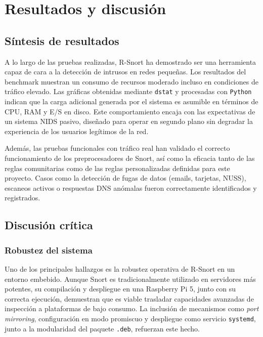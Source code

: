 \documentclass[11pt,a4paper,twoside]{report}
\begin{document}
\chapter*{Resultados y discusión}

\section{Síntesis de resultados}

A lo largo de las pruebas realizadas, R-Snort ha demostrado ser una herramienta capaz de cara a la detección de intrusos en redes pequeñas. Los resultados del benchmark muestran un consumo de recursos moderado incluso en condiciones de tráfico elevado. Las gráficas obtenidas mediante \texttt{dstat} y procesadas con \texttt{Python} indican que la carga adicional generada por el sistema es asumible en términos de CPU, RAM y E/S en disco. Este comportamiento encaja con las expectativas de un sistema NIDS pasivo, diseñado para operar en segundo plano sin degradar la experiencia de los usuarios legítimos de la red.\newline

Además, las pruebas funcionales con tráfico real han validado el correcto funcionamiento de los preprocesadores de Snort, así como la eficacia tanto de las reglas comunitarias como de las reglas personalizadas definidas para este proyecto. Casos como la detección de fugas de datos (emails, tarjetas, NUSS), escaneos activos o respuestas DNS anómalas fueron correctamente identificados y registrados.

\section{Discusión crítica}

\subsection{Robustez del sistema}

Uno de los principales hallazgos es la robustez operativa de R-Snort en un entorno embebido. Aunque Snort es tradicionalmente utilizado en servidores más potentes, su compilación y despliegue en una Raspberry Pi 5, junto con su correcta ejecución, demuestran que es viable trasladar capacidades avanzadas de inspección a plataformas de bajo consumo. La inclusión de mecanismos como \textit{port mirroring}, configuración en modo promiscuo y despliegue como servicio \texttt{systemd}, junto a la modularidad del paquete \texttt{.deb}, refuerzan este hecho.
\end{document}
